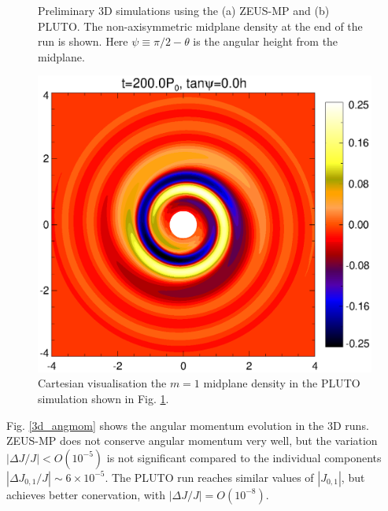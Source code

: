 \begin{figure}
\begin{center}
{    }
  \end{center}
  \caption{Preliminary 3D simulations using the (a) ZEUS-MP and (b)
    PLUTO. The non-axisymmetric midplane density at the end of the run
    is shown. Here $\psi \equiv \pi/2 - \theta$ is the angular height
    from the midplane.\label{3d_prelim}}   
\end{figure}

\begin{figure}
  \includegraphics[width=\linewidth]{figures/pdiskxy_020_m1}
  \caption{Cartesian visualisation the $m=1$ midplane density in the PLUTO
    simulation shown in Fig. \ref{3d_prelim}.\label{pluto_cart}}   
\end{figure} 



Fig. \ref{3d_angmom} shows the angular momentum evolution in the 3D
runs. ZEUS-MP does not conserve angular momentum very well, but
the variation $|\Delta J/J|< O(10^{-5})$ is not significant compared
to the individual components $|\Delta J_{0,1}/J|\sim 
6\times10^{-5}$. The PLUTO run reaches similar values of
$|J_{0,1}|$, but achieves better conervation, with $|\Delta
J/J|=O(10^{-8})$. 


